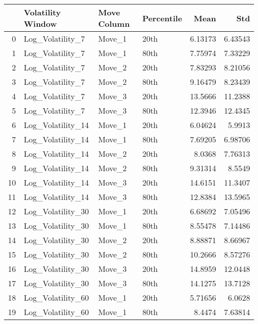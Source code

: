\begin{tabular}{rlllrr}
\hline
    & Volatility Window   & Move Column   & Percentile   &     Mean &      Std \\
\hline
  0 & Log\_Volatility\_7    & Move\_1        & 20th         &  6.13173 &  6.43543 \\
  1 & Log\_Volatility\_7    & Move\_1        & 80th         &  7.75974 &  7.33229 \\
  2 & Log\_Volatility\_7    & Move\_2        & 20th         &  7.83293 &  8.21056 \\
  3 & Log\_Volatility\_7    & Move\_2        & 80th         &  9.16479 &  8.23439 \\
  4 & Log\_Volatility\_7    & Move\_3        & 20th         & 13.5666  & 11.2388  \\
  5 & Log\_Volatility\_7    & Move\_3        & 80th         & 12.3946  & 12.4345  \\
  6 & Log\_Volatility\_14   & Move\_1        & 20th         &  6.04624 &  5.9913  \\
  7 & Log\_Volatility\_14   & Move\_1        & 80th         &  7.69205 &  6.98706 \\
  8 & Log\_Volatility\_14   & Move\_2        & 20th         &  8.0368  &  7.76313 \\
  9 & Log\_Volatility\_14   & Move\_2        & 80th         &  9.31314 &  8.5549  \\
 10 & Log\_Volatility\_14   & Move\_3        & 20th         & 14.6151  & 11.3407  \\
 11 & Log\_Volatility\_14   & Move\_3        & 80th         & 12.8384  & 13.5965  \\
 12 & Log\_Volatility\_30   & Move\_1        & 20th         &  6.68692 &  7.05496 \\
 13 & Log\_Volatility\_30   & Move\_1        & 80th         &  8.55478 &  7.14486 \\
 14 & Log\_Volatility\_30   & Move\_2        & 20th         &  8.88871 &  8.66967 \\
 15 & Log\_Volatility\_30   & Move\_2        & 80th         & 10.2666  &  8.57276 \\
 16 & Log\_Volatility\_30   & Move\_3        & 20th         & 14.8959  & 12.0448  \\
 17 & Log\_Volatility\_30   & Move\_3        & 80th         & 14.1275  & 13.7128  \\
 18 & Log\_Volatility\_60   & Move\_1        & 20th         &  5.71656 &  6.0628  \\
 19 & Log\_Volatility\_60   & Move\_1        & 80th         &  8.4474  &  7.63814 \\

\end{tabular}
